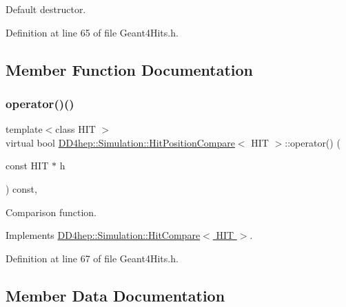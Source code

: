 Default destructor. 



Definition at line 65 of file Geant4\+Hits.\+h.



\subsection{Member Function Documentation}
\hypertarget{struct_d_d4hep_1_1_simulation_1_1_hit_position_compare_aa73aacb44d5a56d3485dd58e38bc505f}{}\label{struct_d_d4hep_1_1_simulation_1_1_hit_position_compare_aa73aacb44d5a56d3485dd58e38bc505f} 
\subsubsection{\texorpdfstring{operator()()}{operator()()}}
{\footnotesize\ttfamily template$<$class H\+IT $>$ \\
virtual bool \hyperlink{struct_d_d4hep_1_1_simulation_1_1_hit_position_compare}{D\+D4hep\+::\+Simulation\+::\+Hit\+Position\+Compare}$<$ H\+IT $>$\+::operator() (\begin{DoxyParamCaption}\item[{const H\+IT $\ast$}]{h }\end{DoxyParamCaption}) const\hspace{0.3cm}{\ttfamily [inline]}, {\ttfamily [virtual]}}



Comparison function. 



Implements \hyperlink{class_d_d4hep_1_1_simulation_1_1_hit_compare_a025eaffc34d0aad36988120c7d158ec7}{D\+D4hep\+::\+Simulation\+::\+Hit\+Compare$<$ H\+I\+T $>$}.



Definition at line 67 of file Geant4\+Hits.\+h.



\subsection{Member Data Documentation}
\hypertarget{struct_d_d4hep_1_1_simulation_1_1_hit_position_compare_a7518eb9e68d39b52d5974d90ddaad47d}{}\label{struct_d_d4hep_1_1_simulation_1_1_hit_position_compare_a7518eb9e68d39b52d5974d90ddaad47d} 
